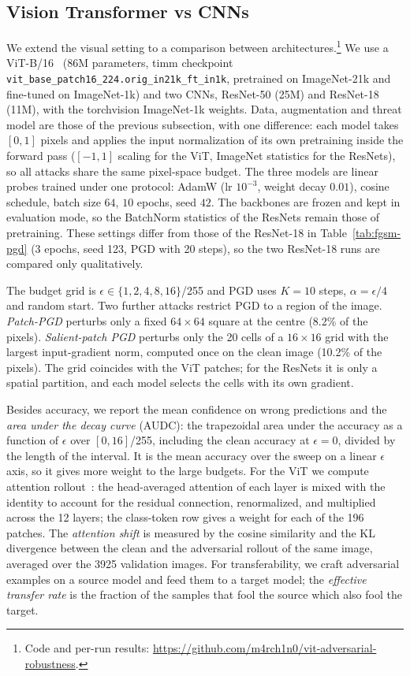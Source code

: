\documentclass{article}
\begin{document}
\subsection{Vision Transformer vs CNNs}\label{sec:vit-method}
We extend the visual setting to a comparison between architectures.\footnote{Code and per-run results: \url{https://github.com/m4rch1n0/vit-adversarial-robustness}.} We use a ViT-B/16~\cite{dosovitskiy2021imageworth16x16words} (86M parameters, timm checkpoint \texttt{vit\_base\_patch16\_224.orig\_in21k\_ft\_in1k}, pretrained on ImageNet-21k and fine-tuned on ImageNet-1k) and two CNNs, ResNet-50 (25M) and ResNet-18 (11M), with the torchvision ImageNet-1k weights. Data, augmentation and threat model are those of the previous subsection, with one difference: each model takes $[0,1]$ pixels and applies the input normalization of its own pretraining inside the forward pass ($[-1,1]$ scaling for the ViT, ImageNet statistics for the ResNets), so all attacks share the same pixel-space budget. The three models are linear probes trained under one protocol: AdamW (lr $10^{-3}$, weight decay $0.01$), cosine schedule, batch size $64$, $10$ epochs, seed $42$. The backbones are frozen and kept in evaluation mode, so the BatchNorm statistics of the ResNets remain those of pretraining. These settings differ from those of the ResNet-18 in Table~\ref{tab:fgsm-pgd} (3 epochs, seed 123, PGD with 20 steps), so the two ResNet-18 runs are compared only qualitatively.

The budget grid is $\epsilon\in\{1,2,4,8,16\}$/255 and PGD uses $K{=}10$ steps, $\alpha=\epsilon/4$ and random start. Two further attacks restrict PGD to a region of the image. \textit{Patch-PGD} perturbs only a fixed $64{\times}64$ square at the centre (8.2\% of the pixels). \textit{Salient-patch PGD} perturbs only the 20 cells of a $16{\times}16$ grid with the largest input-gradient norm, computed once on the clean image (10.2\% of the pixels). The grid coincides with the ViT patches; for the ResNets it is only a spatial partition, and each model selects the cells with its own gradient.

Besides accuracy, we report the mean confidence on wrong predictions and the \textit{area under the decay curve} (AUDC): the trapezoidal area under the accuracy as a function of $\epsilon$ over $[0,16]$/255, including the clean accuracy at $\epsilon=0$, divided by the length of the interval. It is the mean accuracy over the sweep on a linear $\epsilon$ axis, so it gives more weight to the large budgets. For the ViT we compute attention rollout~\cite{abnar2020quantifyingattentionflowtransformers}: the head-averaged attention of each layer is mixed with the identity to account for the residual connection, renormalized, and multiplied across the 12 layers; the class-token row gives a weight for each of the 196 patches. The \textit{attention shift} is measured by the cosine similarity and the KL divergence between the clean and the adversarial rollout of the same image, averaged over the 3925 validation images. For transferability, we craft adversarial examples on a source model and feed them to a target model; the \textit{effective transfer rate} is the fraction of the samples that fool the source which also fool the target.
\end{document}
